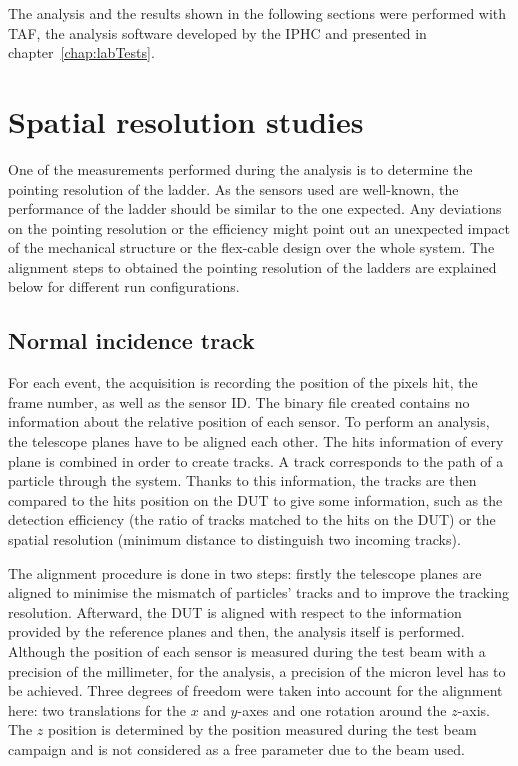     The analysis and the results shown in the following sections were performed with \gls{TAF}, the analysis software developed by the IPHC and presented in chapter~\ref{chap:labTests}.

  \section{Spatial resolution studies}
   
    One of the measurements performed during the analysis is to determine the pointing resolution of the ladder.
    As the sensors used are well-known, the performance of the ladder should be similar to the one expected.
    Any deviations on the pointing resolution or the efficiency might point out an unexpected impact of the mechanical structure or the flex-cable design over the whole system.
    The alignment steps to obtained the pointing resolution of the ladders are explained below for different run configurations. 

    \subsection{Normal incidence track}
     
    For each event, the acquisition is recording the position of the pixels hit, the frame number, as well as the sensor ID.
    The binary file created contains no information about the relative position of each sensor.
    To perform an analysis, the telescope planes have to be aligned each other.
    The hits information of every plane is combined in order to create tracks. 
    A track corresponds to the path of a particle through the system.
    Thanks to this information, the tracks are then compared to the hits position on the \gls{DUT} to give some information, such as the detection efficiency (the ratio of tracks matched to the hits on the \gls{DUT}) or the spatial resolution (minimum distance to distinguish two incoming tracks).

    The alignment procedure is done in two steps: firstly the telescope planes are aligned to minimise the mismatch of particles' tracks and to improve the tracking resolution.
    Afterward, the \gls{DUT} is aligned with respect to the information provided by the reference planes and then, the analysis itself is performed.
    Although the position of each sensor is measured during the test beam with a precision of the millimeter, for the analysis, a precision of the micron level has to be achieved.
    Three degrees of freedom were taken into account for the alignment here: two translations for the $x$ and $y$-axes and one rotation around the $z$-axis.
    The $z$ position is determined by the position measured during the test beam campaign and is not considered as a free parameter due to the beam used.

